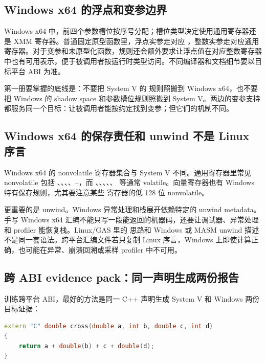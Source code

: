 \subsection{Windows x64 的浮点和变参边界}

Windows x64 中，前四个参数槽位按序号分配；槽位类型决定使用通用寄存器还是 XMM 寄存器。普通固定原型函数里，浮点实参走对应 ，整数实参走对应通用寄存器。对于变参和未原型化函数，规则还会额外要求让浮点值在对应整数寄存器中也有可用表示，便于被调用者按运行时类型访问。不同编译器和文档细节要以目标平台 ABI 为准。

第一册要掌握的底线是：不要把 System V 的  规则照搬到 Windows x64，也不要把 Windows 的 shadow space 和参数槽位规则照搬到 System V。两边的变参支持都服务同一个目标：让被调用者能按约定找到变参；但它们的机制不同。

\subsection{Windows x64 的保存责任和 unwind 不是 Linux 序言}

Windows x64 的 nonvolatile 寄存器集合与 System V 不同。通用寄存器里常见 nonvolatile 包括 、、、、--，而 、、、、、 等通常 volatile。向量寄存器也有 Windows 特有保存规则，尤其要注意某些  寄存器的低 128 位 nonvolatile。

更重要的是 unwind。Windows 异常处理和栈展开依赖特定的 unwind metadata。手写 Windows x64 汇编不能只写一段能返回的机器码，还要让调试器、异常处理和 profiler 能恢复栈。Linux/GAS 里的  思路和 Windows  或 MASM unwind 描述不是同一套语法。跨平台汇编文件若只复制 Linux 序言，Windows 上即使计算正确，也可能在异常、崩溃回溯或采样 profiler 中不可用。

\subsection{跨 ABI evidence pack：同一声明生成两份报告}

训练跨平台 ABI，最好的方法是同一 C++ 声明生成 System V 和 Windows 两份目标证据：

\begin{lstlisting}[language=C++,caption={跨 ABI 对照样例}]
extern "C" double cross(double a, int b, double c, int d)
{
    return a + double(b) + c + double(d);
}
\end{lstlisting}

